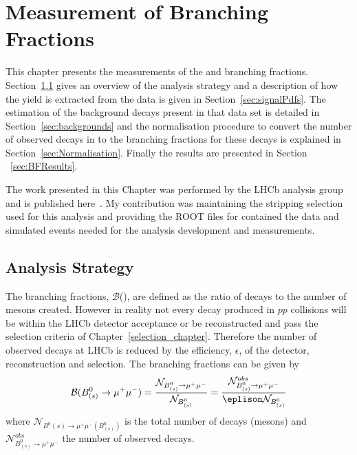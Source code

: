 \chapter{Measurement of \bmumu Branching Fractions}
\label{sec:BFanalysis}
This chapter presents the measurements of the \bdmumu and \bsmumu branching fractions. Section~\ref{sec:BFAnalysisStrategy} gives an overview of the analysis strategy and a description of how the \bmumu yield is extracted from the data is given in Section~\ref{sec:signalPdfs}. The estimation of the background decays present in that data set is detailed in Section~\ref{sec:backgrounds} and the  normalisation procedure to convert the number of observed \bmumu decays in to the branching fractions for these decays is explained in Section~\ref{sec:Normalisation}. Finally the results are presented in Section ~\ref{sec:BFResults}. 

The work presented in this Chapter was performed by the \bmumu LHCb analysis group and is published here~\cite{}. My contribution was  maintaining the stripping selection used for this analysis and providing the ROOT files for contained the data and simulated events needed for the analysis development and measurements.

\section{Analysis Strategy} 
\label{sec:BFAnalysisStrategy}
The \bmumu branching fractions, $\mathcal{B}$(\bmumu), are defined as the ratio of \bmumu decays to the number of \bsd mesons created. However in reality not every \bmumu decay produced in $pp$ collisions will be within the LHCb detector acceptance or be reconstructed and pass the selection criteria of Chapter~\ref{selection_chapter}. Therefore the number of observed \bmumu decays at LHCb is reduced by the efficiency, $\epsilon$, of the detector, reconstruction and selection.
The \bmumu branching fractions can be given by
\begin{equation}
\mathcal{B}(B^{0}_{(s)} \to \mu^{+} \mu^{-}) = \frac{\mathcal{N}_{B^{0}_{(s)} \to \mu^{+} \mu^{-}}}{\mathcal{N}_{B^{0}_{(s)}}} = \frac{\mathcal{N}^{obs}_{B^{0}_{(s)} \to \mu^{+} \mu^{-}}}{\eplison \mathcal{N}_{B^{0}_{(s)}}}
\label{eq:BFdef}
\end{equation}
where $\mathcal{N}_{B^{0}{(s)} \to \mu^{+} \mu^{-}(B^{0}_{(s)})}$ is the total number of \bmumu decays (\bsd mesons) and $\mathcal{N}^{obs}_{B^{0}_{(s)} \to \mu^{+} \mu^{-}}$ the number of observed \bmumu decays.


